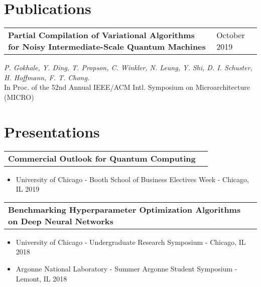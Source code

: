 \documentclass[letterpaper, 12pt]{article}
\begin{document}
\section{Publications}
\vspace{5pt}
\begin{tabular}{@{} L{12cm} @{} R{4.51cm} @{}}
  \textbf{Partial Compilation of Variational Algorithms for Noisy Intermediate-Scale Quantum Machines} & October 2019 \\
\end{tabular}
  \textit{P. Gokhale, Y. Ding, T. Propson, C. Winkler, N. Leung, Y. Shi, D. I. Schuster, H. Hoffmann, F. T. Chong.}\\
  In Proc. of the 52nd Annual IEEE/ACM Intl. Symposium on Microarchitecture (MICRO)



\section{Presentations}
\vspace{5pt}
\begin{tabular}{@{} L{12cm} @{} R{4.51cm} @{}}
  \textbf{Commercial Outlook for Quantum Computing} & \\
\end{tabular}
\vspace{-20pt}
\begin{itemize}
  \item University of Chicago - Booth School of Business Electives Week - Chicago, IL 2019
\end{itemize}

\begin{tabular}{@{} L{12cm} @{} R{4.51cm} @{}}
  \textbf{Benchmarking Hyperparameter Optimization Algorithms on Deep Neural Networks} & \\
\end{tabular}
\vspace{-10pt}
\begin{itemize}
  \item University of Chicago - Undergraduate Research Symposium - Chicago, IL 2018
  \item Argonne National Laboratory - Summer Argonne Student Symposium - Lemont, IL 2018
\end{itemize}
\vspace{5pt}
\end{document}
